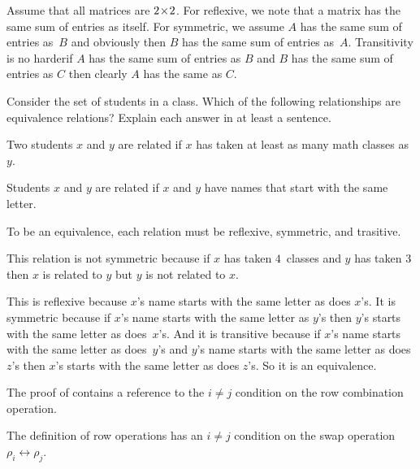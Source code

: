 \begin{exercises}
\begin{answer}
      Assume that all matrices are $2 \! \times \! 2$.
      For reflexive, we note that a matrix has the same sum of entries as
      itself.
      For symmetric, we assume $A$ has the same sum of entries as~$B$ 
      and obviously then $B$ has the same sum of entries as~$A$.
      Transitivity is no harder\Dash if $A$ has the same sum of entries
      as $B$ and $B$ has the same sum of entries as $C$ then clearly
      $A$ has the same as $C$.
    \end{answer}
 \item \cite{Cleary}
  Consider the set of students in a class.  
  Which of the following relationships are equivalence relations?  
  Explain each answer in at least a sentence.
  \begin{exparts}
    \item  Two students $x$ and $y$ are related 
      if $x$ has taken at least as many 
      math classes as $y$.
    \item Students $x$ and $y$ are related if $x$ and $y$ have names 
      that start with the same letter.
  \end{exparts}
  \begin{answer}
    To be an equivalence, each relation must be reflexive, symmetric, and
    trasitive.
    \begin{exparts}
      \item This relation 
        is not symmetric because if $x$ has taken $4$~classes and $y$
        has taken $3$ then $x$ is related to $y$ but $y$ is not related
        to $x$.
      \item This is reflexive because $x$'s name starts with the same
        letter as does $x$'s.
        It is symmetric because if $x$'s name starts with the same letter 
        as $y$'s then $y$'s starts with the same letter as does~$x$'s.
        And it is transitive because if $x$'s name starts with the same letter
        as does~$y$'s and $y$'s name starts with the same letter as 
        does $z$'s then $x$'s starts with the same letter as does $z$'s.
        So it is an equivalence.
    \end{exparts}
  \end{answer}
 \item \label{exer:INotJMakesRowOpsRev}
   The proof of  contains a reference to the 
   $i\neq j$ condition on the row combination operation.
   \begin{exparts}
     \partsitem The definition of row operations has an $i\neq j$ condition on
        the swap operation $\rho_i\leftrightarrow\rho_j$. 

\end{exparts}
\end{exercises}
